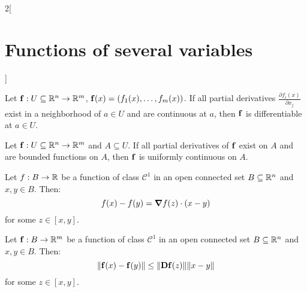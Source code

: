 \documentclass[../../../main.tex]{subfiles}
\begin{document}
\begin{multicols}{2}[\section{Functions of several variables}]
\begin{theorem}
    Let $\boldsymbol{\mathrm{f}}:U\subseteq\mathbb{R}^n\rightarrow\mathbb{R}^m$, $\boldsymbol{\mathrm{f}}(x)=(f_1(x),\ldots,f_m(x))$. If all partial derivatives $\displaystyle \frac{\partial f_i(x)}{\partial x_j}$ exist in a neighborhood of $a\in U$ and are continuous at $a$, then $\boldsymbol{\mathrm{f}}$ is differentiable at $a\in U$.
  \end{theorem}
  \begin{prop}
    Let $\boldsymbol{\mathrm{f}}:U\subseteq\mathbb{R}^n\rightarrow\mathbb{R}^m$ and $A\subseteq U$. If all partial derivatives of $\boldsymbol{\mathrm{f}}$ exist on $A$ and are bounded functions on $A$, then $\boldsymbol{\mathrm{f}}$ is uniformly continuous on $A$.
  \end{prop}
  \begin{theorem}
    Let $f:B\rightarrow\mathbb{R} $ be a function of class $\mathcal{C}^1$ in an open connected set $B\subseteq\mathbb{R}^n$ and $x,y\in B$. Then: $$f(x)-f(y)=\grad f(z)\cdot(x-y)$$ for some $z\in[x,y]$.
  \end{theorem}
  \begin{theorem}
    Let $\boldsymbol{\mathrm{f}}:B\rightarrow\mathbb{R}^m$ be a function of class $\mathcal{C}^1$ in an open connected set $B\subseteq\mathbb{R}^n$ and $x,y\in B$. Then: $$\|\boldsymbol{\mathrm{f}}(x)-\boldsymbol{\mathrm{f}}(y)\|\leq\|\boldsymbol{\mathrm{Df}}(z)\|\|x-y\|$$ for some $z\in[x,y]$.
  \end{theorem}

\end{multicols}
\end{document}
